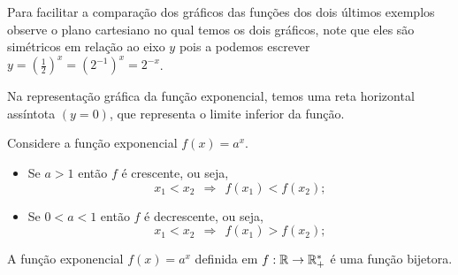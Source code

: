  Para facilitar a comparação dos gráficos das funções dos dois últimos exemplos observe o plano cartesiano  no qual temos os dois gráficos, note que eles são simétricos em relação ao eixo $y$ pois a podemos escrever $y=(\frac{1}{2})^x=(2^{-1})^x=2^{-x}$.

        
        

    \begin{obs}
        Na representação gráfica da função exponencial, temos uma reta horizontal  assíntota $(y=0)$, que representa o limite inferior da função.
    \end{obs}
    
    \begin{obs}
    Considere a função exponencial $f(x)=a^x$.
     \begin{itemize}
         \item Se $a>1$ então $f$ é crescente, ou seja,
         \begin{equation*}
             x_1<x_2 \ \ \Rightarrow\ \ f(x_1)<f(x_2);
         \end{equation*}
         \item Se $0<a<1$ então $f$ é decrescente, ou seja,
         \begin{equation*}
             x_1<x_2 \ \ \Rightarrow\ \ f(x_1)>f(x_2);
         \end{equation*}
     \end{itemize}
 \end{obs}

\begin{obs}
    A função exponencial $f(x)=a^x$ definida em $f:\mathbb{R}\to\mathbb{R}_{+}^*$ é uma função bijetora.
\end{obs}

